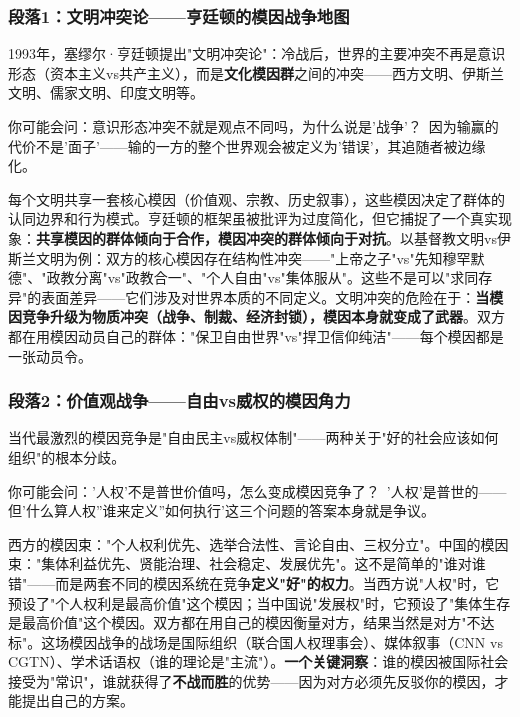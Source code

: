 \documentclass[../main.tex]{subfiles}
\begin{document}
	\subsubsection*{段落1：文明冲突论——亨廷顿的模因战争地图}

	1993年，塞缪尔·亨廷顿提出"文明冲突论"：冷战后，世界的主要冲突不再是意识形态（资本主义vs共产主义），而是\textbf{文化模因群}之间的冲突——西方文明、伊斯兰文明、儒家文明、印度文明等。

	\begin{tcolorbox}[colback=yellow!5, title=\textit{读者行为预测}]

		你可能会问：意识形态冲突不就是观点不同吗，为什么说是'战争'？\ 因为输赢的代价不是'面子'——输的一方的整个世界观会被定义为'错误'，其追随者被边缘化。

	\end{tcolorbox}

每个文明共享一套核心模因（价值观、宗教、历史叙事），这些模因决定了群体的认同边界和行为模式。亨廷顿的框架虽被批评为过度简化，但它捕捉了一个真实现象：\textbf{共享模因的群体倾向于合作，模因冲突的群体倾向于对抗}。以基督教文明vs伊斯兰文明为例：双方的核心模因存在结构性冲突——"上帝之子"vs"先知穆罕默德"、"政教分离"vs"政教合一"、"个人自由"vs"集体服从"。这些不是可以"求同存异"的表面差异——它们涉及对世界本质的不同定义。文明冲突的危险在于：\textbf{当模因竞争升级为物质冲突（战争、制裁、经济封锁），模因本身就变成了武器}。双方都在用模因动员自己的群体："保卫自由世界"vs"捍卫信仰纯洁"——每个模因都是一张动员令。

	\subsubsection*{段落2：价值观战争——自由vs威权的模因角力}

	当代最激烈的模因竞争是"自由民主vs威权体制"——两种关于"好的社会应该如何组织"的根本分歧。

	\begin{tcolorbox}[colback=yellow!5, title=\textit{读者行为预测}]

		你可能会问：'人权'不是普世价值吗，怎么变成模因竞争了？\ '人权'是普世的——但'什么算人权''谁来定义''如何执行'这三个问题的答案本身就是争议。

	\end{tcolorbox}

西方的模因束："个人权利优先、选举合法性、言论自由、三权分立"。中国的模因束："集体利益优先、贤能治理、社会稳定、发展优先"。这不是简单的"谁对谁错"——而是两套不同的模因系统在竞争\textbf{定义"好"的权力}。当西方说"人权"时，它预设了"个人权利是最高价值"这个模因；当中国说"发展权"时，它预设了"集体生存是最高价值"这个模因。双方都在用自己的模因衡量对方，结果当然是对方"不达标"。这场模因战争的战场是国际组织（联合国人权理事会）、媒体叙事（CNN vs CGTN）、学术话语权（谁的理论是"主流"）。\textbf{一个关键洞察}：谁的模因被国际社会接受为"常识"，谁就获得了\textbf{不战而胜}的优势——因为对方必须先反驳你的模因，才能提出自己的方案。
\end{document}
